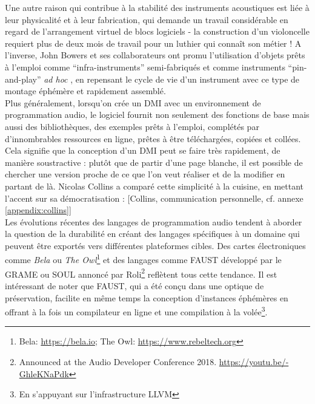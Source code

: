 \noindent Une autre raison qui contribue à la stabilité des instruments acoustiques est liée à leur physicalité et à leur fabrication, qui demande un travail considérable en regard de l'arrangement virtuel de blocs logiciels - la construction d'un violoncelle requiert plus de deux mois de travail pour un luthier qui connaît son métier ! A l'inverse, John Bowers et ses collaborateurs ont promu l'utilisation d'objets prêts à l'emploi comme ``infra-instruments'' semi-fabriqués \cite{bowers_not_2005} et comme instruments ``pin-and-play'' \textit{ad hoc} \cite{bowers_creating_2006}, en repensant le cycle de vie d'un instrument avec ce type de montage éphémère et rapidement assemblé.\\
\indent Plus généralement, lorsqu'on crée un \gls{DMI} avec un environnement de programmation audio, le logiciel fournit non seulement des fonctions de base mais aussi des bibliothèques, des exemples prêts à l'emploi, complétés par d'innombrables ressources en ligne, prêtes à être téléchargées, copiées et collées.\\
\indent Cela signifie que la conception d'un \gls{DMI} peut se faire très rapidement, de manière soustractive : plutôt que de partir d'une page blanche, il est possible de chercher une version proche de ce que l'on veut réaliser et de la modifier en partant de là. Nicolas Collins a comparé cette simplicité à la cuisine, en mettant l'accent sur sa démocratisation :  [Collins, communication personnelle, cf. annexe \ref{appendix:collins}]\\
\indent Les évolutions récentes des langages de programmation audio tendent à aborder la question de la durabilité en créant des langages spécifiques à un domaine qui peuvent être exportés vers différentes plateformes cibles. Des cartes électroniques comme \textit{Bela} ou \textit{The Owl}\footnote{Bela: \url{https://bela.io}; The Owl: \url{https://www.rebeltech.org}} et des langages comme \gls{FAUST} développé par le \gls{GRAME} \cite{orlarey_faust_2008} ou SOUL annoncé par Roli\footnote{Announced at the Audio Developer Conference 2018. \url{https://youtu.be/-GhleKNaPdk}} reflètent tous cette tendance. Il est intéressant de noter que \gls{FAUST}, qui a été conçu dans une optique de préservation, facilite en même temps la conception d'instances éphémères en offrant à la fois un compilateur en ligne et une compilation à la volée\footnote{En s'appuyant sur l'infrastructure \gls{LLVM}}.
	
